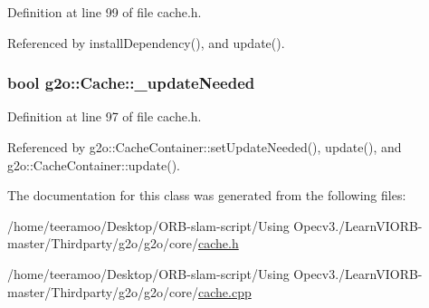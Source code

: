 Definition at line 99 of file cache.\+h.



Referenced by install\+Dependency(), and update().

\subsubsection[{\texorpdfstring{\+\_\+update\+Needed}{_updateNeeded}}]{\setlength{\rightskip}{0pt plus 5cm}bool g2o\+::\+Cache\+::\+\_\+update\+Needed\hspace{0.3cm}{\ttfamily [protected]}}\hypertarget{classg2o_1_1Cache_a28d0ad45da71d9b7bc6de4cf1fb0f9e4}{}\label{classg2o_1_1Cache_a28d0ad45da71d9b7bc6de4cf1fb0f9e4}


Definition at line 97 of file cache.\+h.



Referenced by g2o\+::\+Cache\+Container\+::set\+Update\+Needed(), update(), and g2o\+::\+Cache\+Container\+::update().



The documentation for this class was generated from the following files\+:\begin{DoxyCompactItemize}
\item 
/home/teeramoo/\+Desktop/\+O\+R\+B-\/slam-\/script/\+Using Opecv3./\+Learn\+V\+I\+O\+R\+B-\/master/\+Thirdparty/g2o/g2o/core/\hyperlink{cache_8h}{cache.\+h}\item 
/home/teeramoo/\+Desktop/\+O\+R\+B-\/slam-\/script/\+Using Opecv3./\+Learn\+V\+I\+O\+R\+B-\/master/\+Thirdparty/g2o/g2o/core/\hyperlink{cache_8cpp}{cache.\+cpp}\end{DoxyCompactItemize}
